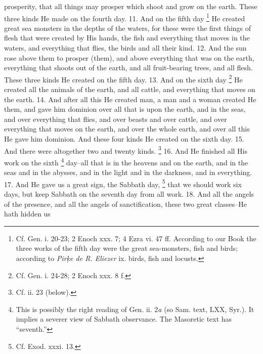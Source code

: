 prosperity, that all things may prosper which shoot and grow on the earth. These three kinds He made on the fourth day. 11. And on the fifth day \footnote{Cf. Gen. i. 20-23; 2 Enoch xxx. 7; 4 Ezra vi. 47 ff. According to our Book the three works of the fifth day were the great sea-monsters, fish and birds; according to \emph{Pir\d{k}e de R. Eliezer} ix. birds, fish and locusts.} He created great sea monsters in the depths of the waters, for these were the first things of flesh that were created by His hands, the fish and everything that moves in the waters, and everything that flies, the birds and all their kind. 12. And the sun rose above them to prosper (them), and above everything that was on the earth, everything that shoots out of the earth, and all fruit-bearing trees, and all flesh. These three kinds He created on the fifth day. 13. And on the sixth day \footnote{Cf. Gen. i. 24-28; 2 Enoch xxx. 8 f.} He created all the animals of the earth, and all cattle, and everything that moves on the earth. 14. And after all this He created man, a man and a woman created He them, and gave him dominion over all that is upon the earth, and in the seas, and over everything that flies, and over beasts and over cattle, and over everything that moves on the earth, and over the whole earth, and over all this He gave him dominion. And these four kinds He created on the sixth day. 15. And there were altogether two and twenty kinds. \footnote{Cf. ii. 23 (below).} 16. And He finished all His work on the sixth \footnote{This is possibly the right reading of Gen. ii. 2\emph{a} (so Sam. text, LXX, Syr.). It implies a severer view of Sabbath observance. The Masoretic text has ``seventh.''} day--all that is in the heavens and on the earth, and in the seas and in the abysses, and in the light and in the darkness, and in everything. 17. And He gave us a great sign, the Sabbath day, \footnote{Cf. Exod. xxxi. 13.} that we should work six days, but keep Sabbath on the seventh day from all work. 18. And all the angels of the presence, and all the angels of sanctification, these two great classes--He hath hidden us


